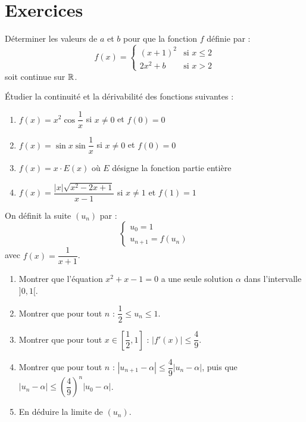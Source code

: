\documentclass[../PolyS2.tex]{subfiles}
\begin{document}
\section{Exercices}


Déterminer les valeurs de $a$ et $b$ pour que la fonction $f$ définie par :
$$f(x) = \begin{cases}
    (x+1)^2 & \text{si } x \leq 2 \\
    2x^2 + b & \text{si } x > 2
\end{cases}$$
soit continue sur $\mathbb{R}$.

\newpage


Étudier la continuité et la dérivabilité des fonctions suivantes :
\begin{enumerate}
    \item $f(x) = x^2 \cos\dfrac{1}{x}$ si $x \neq 0$ et $f(0) = 0$
    \item $f(x) = \sin x \sin\dfrac{1}{x}$ si $x \neq 0$ et $f(0) = 0$
    \item $f(x) = x \cdot E(x)$ où $E$ désigne la fonction partie entière
    \item $f(x) = \dfrac{|x|\sqrt{x^2 - 2x + 1}}{x - 1}$ si $x \neq 1$ et $f(1) = 1$
\end{enumerate}


On définit la suite $(u_n)$ par :
$$\begin{cases}
    u_0 = 1 \\
    u_{n+1} = f(u_n)
\end{cases}$$
avec $f(x) = \dfrac{1}{x+1}$.
\begin{enumerate}
    \item Montrer que l'équation $x^2 + x - 1 = 0$ a une seule solution $\alpha$ dans l'intervalle $]0, 1[$.
    \item Montrer que pour tout $n$ : $\dfrac{1}{2} \leq u_n \leq 1$.
    \item Montrer que pour tout $x \in \left[\dfrac{1}{2}, 1\right]$ : $|f'(x)| \leq \dfrac{4}{9}$.
    \item Montrer que pour tout $n$ : $|u_{n+1} - \alpha| \leq \dfrac{4}{9}|u_n - \alpha|$, puis que $|u_n - \alpha| \leq \left(\dfrac{4}{9}\right)^n |u_0 - \alpha|$.
    \item En déduire la limite de $(u_n)$.
\end{enumerate}
\end{document}
